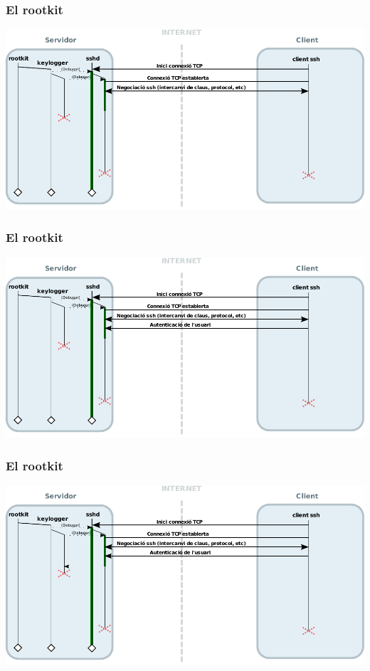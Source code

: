 \documentclass{beamer}
\begin{document}
\begin{frame}
	\frametitle{El rootkit}
	\includegraphics[scale=0.65,keepaspectratio]{sshd_keylogger_7.pdf}
\end{frame}

\begin{frame}
	\frametitle{El rootkit}
	\includegraphics[scale=0.65,keepaspectratio]{sshd_keylogger_8.pdf}
\end{frame}

\begin{frame}
	\frametitle{El rootkit}
	\includegraphics[scale=0.65,keepaspectratio]{sshd_keylogger_9.pdf}
\end{frame}
\end{document}
